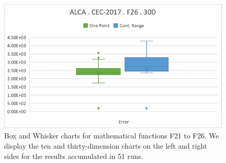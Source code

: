 \documentclass[graybox]{svmult}
\begin{document}
\begin{figure}[!ht]
\begin{minipage}[h]{0.49\linewidth}
        \end{minipage}
        \hfill
        \begin{minipage}[h]{0.49\linewidth}
            \includegraphics[width=1\linewidth]{img/fig_experiment_F26x30D.pdf} 
        \end{minipage}

        \caption{Box and Whisker charts for mathematical functions F21 to F26. We display the ten and thirty-dimension charts on the left and right sides for the results accumulated in 51 runs.} \label{fig.experiment_F21-F26}
    \end{figure}

    \FloatBarrier
\end{document}
